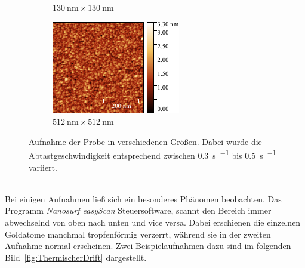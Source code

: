 \documentclass[a4paper,twoside,final]{article}
\begin{document}
\begin{figure}[htp]
\begin{subfigure}{0.3\textwidth}
        \caption{$\SI{130}{\nano\metre}\times\SI{130}{\nano\metre}$}
    \end{subfigure}
    \hspace{0.5cm}
    \begin{subfigure}{0.3\textwidth}
        \includegraphics[width=\textwidth]{Bilder/Image01986_512nm.pdf}
        \caption{$\SI{512}{\nano\metre}\times\SI{512}{\nano\metre}$}
    \end{subfigure}
    \caption{Aufnahme der Probe in verschiedenen Größen. Dabei wurde die Abtastgeschwindigkeit entsprechend zwischen \SI{0,3}{\second\per{}} bis \SI{0,5}{\second\per{}} variiert.}
    \label{fig:verschiedeneGroesse}
\end{figure}\\
Bei einigen Aufnahmen ließ sich ein besonderes Phänomen beobachten. Das Programm \textit{Nanosurf easyScan} Steuersoftware, scannt den Bereich immer abwechselnd von oben nach unten und vice versa. Dabei erschienen die einzelnen Goldatome manchmal tropfenförmig verzerrt, während sie in der zweiten Aufnahme normal erscheinen. Zwei Beispielaufnahmen dazu sind im folgenden Bild~\ref{fig:ThermischerDrift} dargestellt.
\end{document}
